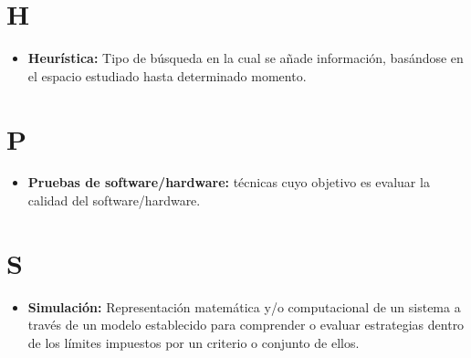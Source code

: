 \section*{H}
\begin{itemize}
	\item \textbf{Heurística:} Tipo de búsqueda en la cual se añade información, basándose en el espacio estudiado hasta determinado momento. 
\end{itemize}

\section*{P}
\begin{itemize}
	\item \textbf{Pruebas de software/hardware:} t\'ecnicas cuyo objetivo es evaluar la calidad del software/hardware.
\end{itemize}

\section*{S}
\begin{itemize}
	\item \textbf{Simulación:} Representación matemática y/o computacional de un sistema a través de un modelo establecido para comprender o evaluar estrategias dentro de los límites impuestos por un criterio o conjunto de ellos.
\end{itemize}





